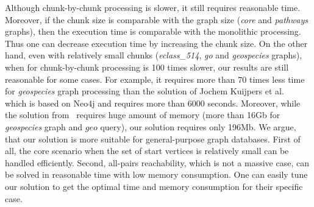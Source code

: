 Although chunk-by-chunk processing is slower, it still requires reasonable time.
Moreover, if the chunk size is comparable with the graph size (\textit{core} and \textit{pathways} graphs), then the execution time is comparable with the monolithic processing.
Thus one can decrease execution time by increasing the chunk size.
On the other hand, even with relatively small chunks (\textit{eclass\_514}, \textit{go} and \textit{geospecies} graphs), when for chunk-by-chunk processing is 100 times slower, our results are still reasonable for some cases.
For example, it requires more than 70 times less time for \textit{geospecies} graph processing than the solution of Jochem Kuijpers et al.~\cite{Kuijpers:2019:ESC:3335783.3335791} which is based on Neo4j and requires more than 6000 seconds.
Moreover, while the solution from~\cite{10.1145/3398682.3399163} requires huge amount of memory (more than 16Gb for \textit{geospecies} graph and $geo$ query), our solution requires only 196Mb.
We argue, that our solution is more suitable for general-purpose graph databases.
First of all, the core scenario when the set of start vertices is relatively small can be handled efficiently.
Second, all-pairs reachability, which is not a massive case, can be solved in reasonable time with low memory consumption.
One can easily tune our solution to get the optimal time and memory consumption for their specific case.
